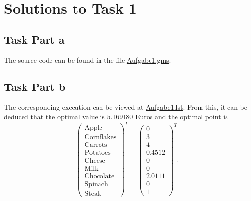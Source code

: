 \documentclass[a4paper,12pt]{article}
\begin{document}
\newpage

\section*{Solutions to Task 1}

\subsection*{Task Part a}

The source code can be found in the file \href{../src/r1/Aufgabe1.gms}{Aufgabe1.gms}.

\subsection*{Task Part b}

The corresponding execution can be viewed at \href{../results/r1/Aufgabe1.lst}{Aufgabe1.lst}. From this, it can be deduced that the optimal value is $5.169180$ Euros and the optimal point is
\[
\begin{pmatrix}
\text{Apple} \\ 
\text{Cornflakes} \\ 
\text{Carrots} \\ 
\text{Potatoes} \\ 
\text{Cheese} \\ 
\text{Milk} \\ 
\text{Chocolate} \\ 
\text{Spinach} \\ 
\text{Steak}
\end{pmatrix}^T
=
\begin{pmatrix}
0 \\ 
3 \\ 
4 \\ 
0.4512 \\ 
0 \\ 
0 \\ 
2.0111 \\
0 \\
1
\end{pmatrix}^T.
\]

\newpage
\end{document}

